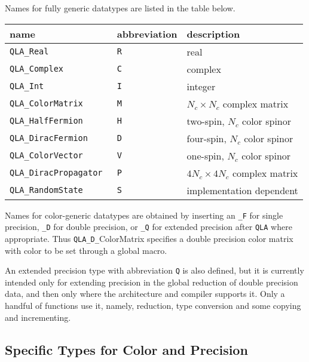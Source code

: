 \documentclass{article}
\newcommand{\tReal}{QLA\ttdash Real }
\newcommand{\tComplex}{QLA\ttdash Complex }
\newcommand{\tInt}{QLA\ttdash Int }
\newcommand{\tColorMatrix}{QLA\ttdash ColorMatrix }
\newcommand{\tHalfFermion}{QLA\ttdash HalfFermion }
\newcommand{\tDiracFermion}{QLA\ttdash DiracFermion }
\newcommand{\tColorVector}{QLA\ttdash ColorVector }
\newcommand{\tDiracPropagator}{QLA\ttdash DiracPropagator }
\newcommand{\tRandomState}{QLA\ttdash RandomState }
\newcommand{\ttdash}{{\tt \_}}
\begin{document}
Names for fully generic datatypes are listed in the table below.
\begin{center}
\begin{tabular}{|l|l|l|}
\hline
name                      & abbreviation & description \\
\hline
{\tt \tReal            } & {\tt R} & real \\
{\tt \tComplex         } & {\tt C} & complex \\
{\tt \tInt             } & {\tt I} & integer \\
{\tt \tColorMatrix     } & {\tt M} & $N_c \times N_c$ complex matrix \\
{\tt \tHalfFermion     } & {\tt H} & two-spin, $N_c$ color spinor \\
{\tt \tDiracFermion    } & {\tt D} & four-spin, $N_c$ color spinor \\
{\tt \tColorVector} & {\tt V} & one-spin,  $N_c$ color spinor \\
{\tt \tDiracPropagator } & {\tt P} & $4N_c \times 4N_c$ complex matrix \\
{\tt \tRandomState     } & {\tt S} & implementation dependent \\
\hline
\end{tabular}
\end{center}
Names for color-generic datatypes are obtained by inserting an
\ttdash{\tt F} for single precision, \ttdash{\tt D} for double
precision, or \ttdash{\tt Q} for extended precision after {\tt QLA}
where appropriate.  Thus {\tt QLA}\ttdash{\tt D}\ttdash{ColorMatrix}
specifies a double precision color matrix with color to be set through
a global macro.

An extended precision type with abbreviation {\tt Q} is also defined,
but it is currently intended only for extending precision in the
global reduction of double precision data, and then only where the
architecture and compiler supports it.  Only a handful of functions
use it, namely, reduction, type conversion and some copying and
incrementing.

\subsection{Specific Types for Color and Precision}
\end{document}
